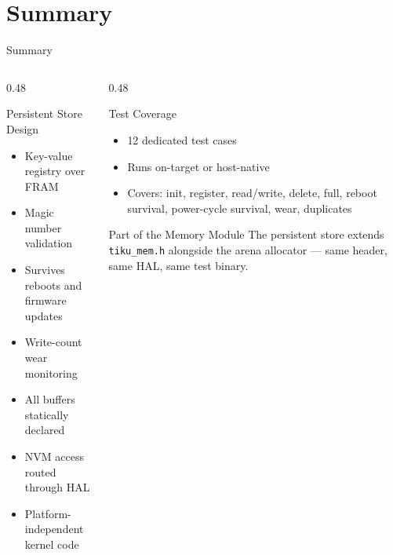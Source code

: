 \documentclass[aspectratio=169, 10pt]{beamer}
\begin{document}
\section{Summary}

\begin{frame}{Summary}
\begin{columns}[T]
\begin{column}{0.48\textwidth}
\begin{block}{Persistent Store Design}
\begin{itemize}
  \item Key-value registry over FRAM
  \item Magic number validation
  \item Survives reboots and firmware updates
  \item Write-count wear monitoring
  \item All buffers statically declared
  \item NVM access routed through HAL
  \item Platform-independent kernel code
\end{itemize}
\end{block}
\end{column}

\begin{column}{0.48\textwidth}
\begin{block}{Test Coverage}
\begin{itemize}
  \item 12 dedicated test cases
  \item Runs on-target or host-native
  \item Covers: init, register, read/write, delete, full, reboot survival, power-cycle survival, wear, duplicates
\end{itemize}
\end{block}

\vspace{0.3em}
\begin{alertblock}{Part of the Memory Module}
The persistent store extends \texttt{tiku\_mem.h} alongside
the arena allocator --- same header, same HAL, same test binary.
\end{alertblock}
\end{column}
\end{columns}
\end{frame}
\end{document}

